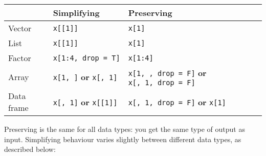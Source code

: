 \begin{longtable}[]{@{}lll@{}}
\toprule
& Simplifying & Preserving\tabularnewline
\midrule
\endhead
Vector & \texttt{x{[}{[}1{]}{]}} & \texttt{x{[}1{]}}\tabularnewline
List & \texttt{x{[}{[}1{]}{]}} & \texttt{x{[}1{]}}\tabularnewline
Factor & \texttt{x{[}1:4,\ drop\ =\ T{]}} &
\texttt{x{[}1:4{]}}\tabularnewline
Array & \texttt{x{[}1,\ {]}} \textbf{or} \texttt{x{[},\ 1{]}} &
\texttt{x{[}1,\ ,\ drop\ =\ F{]}} \textbf{or}
\texttt{x{[},\ 1,\ drop\ =\ F{]}}\tabularnewline
Data frame & \texttt{x{[},\ 1{]}} \textbf{or} \texttt{x{[}{[}1{]}{]}} &
\texttt{x{[},\ 1,\ drop\ =\ F{]}} \textbf{or}
\texttt{x{[}1{]}}\tabularnewline
\bottomrule
\end{longtable}

Preserving is the same for all data types: you get the same type of
output as input. Simplifying behaviour varies slightly between different
data types, as described below:

